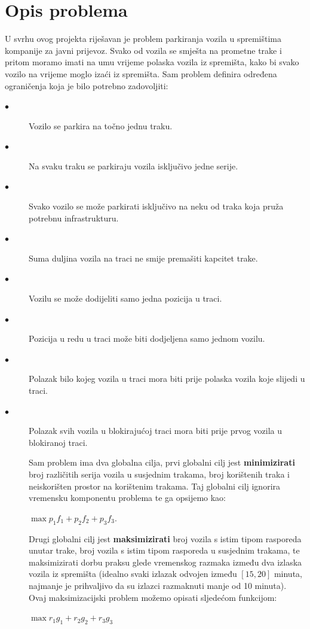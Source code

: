 \documentclass[11pt]{article}
\begin{document}
\section{Opis problema}
U svrhu ovog projekta riješavan je problem parkiranja vozila u spremištima kompanije za javni prijevoz. Svako od vozila se smješta na prometne trake i pritom moramo imati na umu vrijeme polaska vozila iz spremišta, kako bi svako vozilo na vrijeme moglo izaći iz spremišta. Sam problem definira određena ograničenja koja je bilo potrebno zadovoljiti:
\begin{description}
  \item[$\bullet$] Vozilo se parkira na točno jednu traku.
  \item[$\bullet$] Na svaku traku se parkiraju vozila isključivo jedne serije.
  \item[$\bullet$] Svako vozilo se može parkirati isključivo na neku od traka koja pruža potrebnu infrastrukturu.
  \item[$\bullet$] Suma duljina vozila na traci ne smije premašiti kapcitet trake.
  \item[$\bullet$] Vozilu se može dodijeliti samo jedna pozicija u traci.
  \item[$\bullet$] Pozicija u redu u traci može biti dodjeljena  samo jednom vozilu.
  \item[$\bullet$] Polazak bilo kojeg vozila u traci mora biti prije polaska vozila koje slijedi u traci.
    \item[$\bullet$] Polazak svih vozila u blokirajućoj traci mora biti prije prvog vozila u blokiranoj traci.
    
Sam problem ima dva globalna cilja, prvi globalni cilj jest \textbf{minimizirati} broj različitih serija vozila u susjednim trakama, broj korištenih traka i neiskorišten prostor na korištenim trakama. Taj globalni cilj ignorira vremensku komponentu problema te ga opsijemo kao: \\
\begin{center}
  $\max p_1f_1 + p_2f_2 + p_3f_3$.\\ 
\end{center}


Drugi globalni cilj jest \textbf{maksimizirati} broj vozila s istim tipom rasporeda unutar trake, broj vozila s istim tipom rasporeda u susjednim trakama, te maksimizirati dorbu praksu glede vremenskog razmaka između dva izlaska vozila iz spremišta (idealno svaki izlazak odvojen između $[15,20]$  minuta, najmanje je prihvaljivo da su izlazci razmaknuti manje od 10 minuta).
Ovaj maksimizacijski problem možemo opisati sljedećom funkcijom:
\begin{center}
$\max r_1g_1 + r_2g_2 + r_3g_3$
\end{center}



\end{description}
\end{document}
